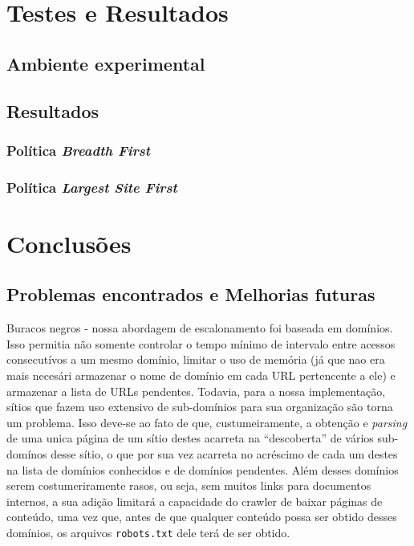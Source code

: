 \documentclass[10pt,twocolumn]{article}
\begin{document}
\section{Testes e Resultados}

\subsection{Ambiente experimental}

\subsection{Resultados}

\subsubsection{Política \emph{Breadth First}}

\subsubsection{Política \emph{Largest Site First}}



\section{Conclusões}


\subsection{Problemas encontrados e Melhorias futuras}

Buracos negros - nossa abordagem de escalonamento foi baseada em domínios. Isso
permitia não somente controlar o tempo mínimo de intervalo entre acessos
consecutívos a um mesmo domínio, limitar o uso de memória (já que nao era mais
necesári armazenar o nome de domínio em cada URL pertencente a ele) e armazenar
a lista de URLs pendentes. Todavia, para a nossa implementação, sítios que
fazem uso extensivo de sub-domínios para sua organização são torna um problema.
Isso deve-se ao fato de que, custumeiramente, a obtenção e \emph{parsing} de
uma unica página de um sítio destes acarreta na ``descoberta'' de vários
sub-domínos desse sítio, o que por sua vez acarreta no acréscimo de cada um
destes na lista de domínios conhecidos e de domínios pendentes. Além desses
domínios serem costumeriramente rasos, ou seja, sem muitos links para
documentos internos, a sua adição limitará a capacidade do crawler de baixar
páginas de conteúdo, uma vez que, antes de que qualquer conteúdo possa ser
obtido desses domínios, os arquivos \texttt{robots.txt} dele terá de ser
obtido.
\end{document}
